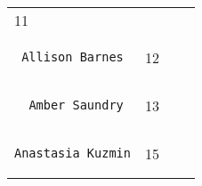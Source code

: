 \documentclass[]{article}
\begin{document}
\begin{longtable}[c]{@{}llll@{}}
\begin{minipage}[t]{0.10\columnwidth}
11
\end{minipage} & \begin{minipage}[t]{0.13\columnwidth}\raggedright
\end{minipage} & \begin{minipage}[t]{0.15\columnwidth}\raggedright
\end{minipage}
\\\noalign{\medskip}
\begin{minipage}[t]{0.39\columnwidth}\raggedright
\begin{verbatim}
 Allison Barnes
\end{verbatim}
\end{minipage} & \begin{minipage}[t]{0.10\columnwidth}\raggedright
12
\end{minipage} & \begin{minipage}[t]{0.13\columnwidth}\raggedright
\end{minipage} & \begin{minipage}[t]{0.15\columnwidth}\raggedright
\end{minipage}
\\\noalign{\medskip}
\begin{minipage}[t]{0.39\columnwidth}\raggedright
\begin{verbatim}
  Amber Saundry
\end{verbatim}
\end{minipage} & \begin{minipage}[t]{0.10\columnwidth}\raggedright
13
\end{minipage} & \begin{minipage}[t]{0.13\columnwidth}\raggedright
\end{minipage} & \begin{minipage}[t]{0.15\columnwidth}\raggedright
\end{minipage}
\\\noalign{\medskip}
\begin{minipage}[t]{0.39\columnwidth}\raggedright
\begin{verbatim}
Anastasia Kuzmin
\end{verbatim}
\end{minipage} & \begin{minipage}[t]{0.10\columnwidth}\raggedright
15
\end{minipage} & \begin{minipage}[t]{0.13\columnwidth}\raggedright
\end{minipage} & \begin{minipage}[t]{0.15\columnwidth}\raggedright

\end{minipage}
\end{longtable}
\end{document}
